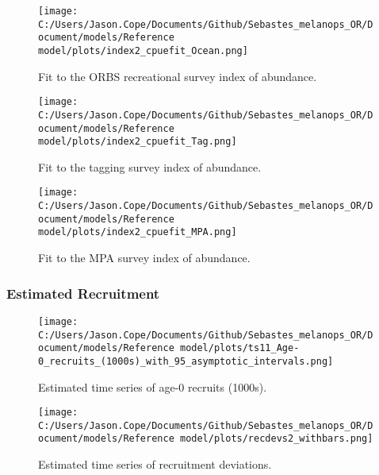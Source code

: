 \documentclass[11pt,
  letterpaper,
]{article}
\begin{document}
\newpage

\begin{figure}
{\centering
\texttt{[image: C:/Users/Jason.Cope/Documents/Github/Sebastes\_melanops\_OR/Document/models/Reference model/plots/index2\_cpuefit\_Ocean.png]}
}
\caption{Fit to the ORBS recreational survey index of abundance.\label{fig:orbs-index-fit}}
\end{figure}

\newpage

\begin{figure}
{\centering
\texttt{[image: C:/Users/Jason.Cope/Documents/Github/Sebastes\_melanops\_OR/Document/models/Reference model/plots/index2\_cpuefit\_Tag.png]}
}
\caption{Fit to the tagging survey index of abundance.\label{fig:tag-index-fit}}
\end{figure}

\newpage

\begin{figure}
{\centering
\texttt{[image: C:/Users/Jason.Cope/Documents/Github/Sebastes\_melanops\_OR/Document/models/Reference model/plots/index2\_cpuefit\_MPA.png]}
}
\caption{Fit to the MPA survey index of abundance.\label{fig:mpa-index-fit}}
\end{figure}

\newpage

\hypertarget{estimated-recruitment}{%
\subsubsection{Estimated Recruitment}\label{estimated-recruitment}}

\begin{figure}
{\centering
\texttt{[image: C:/Users/Jason.Cope/Documents/Github/Sebastes\_melanops\_OR/Document/models/Reference model/plots/ts11\_Age-0\_recruits\_(1000s)\_with\_95\_asymptotic\_intervals.png]}
}
\caption{Estimated time series of age-0 recruits (1000s).\label{fig:recruits}}
\end{figure}

\newpage

\begin{figure}
{\centering
\texttt{[image: C:/Users/Jason.Cope/Documents/Github/Sebastes\_melanops\_OR/Document/models/Reference model/plots/recdevs2\_withbars.png]}
}
\caption{Estimated time series of recruitment deviations.\label{fig:rec-devs}}
\end{figure}
\end{document}
